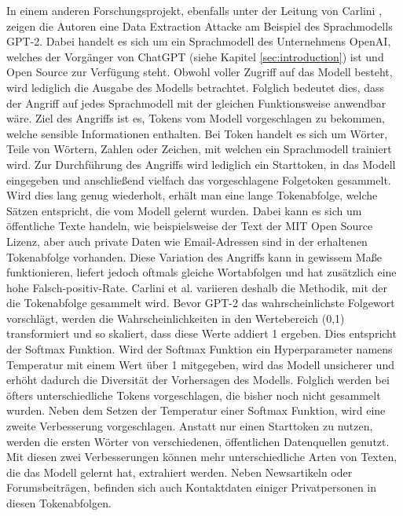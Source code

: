 In einem anderen Forschungsprojekt, ebenfalls unter der Leitung von Carlini \cite{P-88}, zeigen die Autoren eine Data Extraction Attacke am Beispiel des Sprachmodells GPT-2. 
Dabei handelt es sich um ein Sprachmodell des Unternehmens OpenAI, welches der Vorgänger von ChatGPT (siehe Kapitel \ref{sec:introduction}) ist und Open Source zur Verfügung steht.
Obwohl voller Zugriff auf das Modell besteht, wird lediglich die Ausgabe des Modells betrachtet. 
Folglich bedeutet dies, dass der Angriff auf jedes Sprachmodell mit der gleichen Funktionsweise anwendbar wäre.
Ziel des Angriffs ist es, Tokens vom Modell vorgeschlagen zu bekommen, welche sensible Informationen enthalten.
Bei Token handelt es sich um Wörter, Teile von Wörtern, Zahlen oder Zeichen, mit welchen ein Sprachmodell trainiert wird.
Zur Durchführung des Angriffs wird lediglich ein Starttoken, in das Modell eingegeben und anschließend vielfach das vorgeschlagene Folgetoken gesammelt. 
Wird dies lang genug wiederholt, erhält man eine lange Tokenabfolge, welche Sätzen entspricht, die vom Modell gelernt wurden. 
Dabei kann es sich um öffentliche Texte handeln, wie beispielsweise der Text der MIT Open Source Lizenz, aber auch private Daten wie Email-Adressen sind in der erhaltenen Tokenabfolge vorhanden.
Diese Variation des Angriffs kann in gewissem Maße funktionieren, liefert jedoch oftmals gleiche Wortabfolgen und hat zusätzlich eine hohe Falsch-positiv-Rate.
Carlini et al. \cite{P-88} variieren deshalb die Methodik, mit der die Tokenabfolge gesammelt wird.
Bevor GPT-2 das wahrscheinlichste Folgewort vorschlägt, werden die Wahrscheinlichkeiten in den Wertebereich (0,1) transformiert und so skaliert, dass diese Werte addiert 1 ergeben.
Dies entspricht der Softmax Funktion.
Wird der Softmax Funktion ein Hyperparameter namens Temperatur mit einem Wert über 1 mitgegeben, wird das Modell unsicherer und erhöht dadurch die Diversität der Vorhersagen des Modells.
Folglich werden bei öfters unterschiedliche Tokens vorgeschlagen, die bisher noch nicht gesammelt wurden.
Neben dem Setzen der Temperatur einer Softmax Funktion, wird eine zweite Verbesserung vorgeschlagen. 
Anstatt nur einen Starttoken zu nutzen, werden die ersten Wörter von verschiedenen, öffentlichen Datenquellen genutzt.
Mit diesen zwei Verbesserungen können mehr unterschiedliche Arten von Texten, die das Modell gelernt hat, extrahiert werden. 
Neben Newsartikeln oder Forumsbeiträgen, befinden sich auch Kontaktdaten einiger Privatpersonen in diesen Tokenabfolgen.